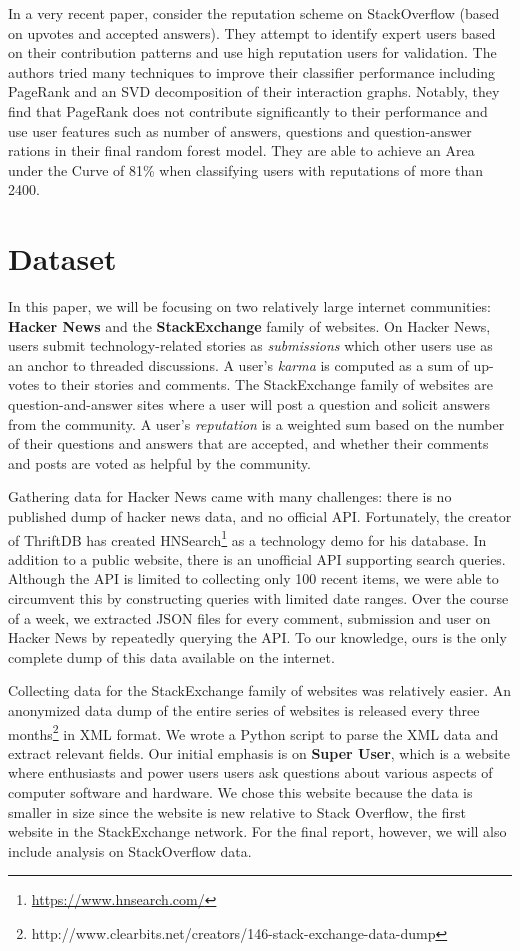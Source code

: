 \documentclass[11pt]{article}
\begin{document}
In a very recent paper, \citet{movshovitzanalysis} consider the reputation
scheme on StackOverflow (based on upvotes and accepted answers). They 
attempt to identify expert users based on their contribution
patterns and use high reputation users for validation. The authors tried many 
techniques to improve their classifier performance including PageRank and
an SVD decomposition of their interaction graphs. Notably, they find
that PageRank does not contribute significantly to their performance
and use user features such as number of answers, questions and question-answer 
rations in their final random forest model. They are
able to achieve an Area under the Curve of 81\% when classifying users
with reputations of more than 2400.

\section{Dataset}
In this paper, we will be focusing on two relatively large internet communities:
\textbf{Hacker News} and the \textbf{StackExchange} family of
websites. On Hacker News, users submit technology-related stories as
\textit{submissions} which other users use as an anchor to threaded discussions.
A user's \textit{karma} is computed as a sum of up-votes to their stories and
comments.  The StackExchange family of websites are question-and-answer sites
where a user will post a question and solicit answers from the community. A
user's \textit{reputation} is a weighted sum based on the number of their
questions and answers that are accepted, and whether their comments and posts
are voted as helpful by the community.

Gathering data for Hacker News came with many challenges: there is no published
dump of hacker news data, and no official API. Fortunately, the creator
of ThriftDB has created HNSearch\footnote{\url{https://www.hnsearch.com/}} as a technology
demo for his database. In addition to a public website, there is an unofficial API
supporting search queries. Although the API is limited to collecting 
only 100 recent items, we were able to circumvent this by constructing queries with limited
date ranges. Over the course of a week, we extracted JSON files for every comment,
submission and user on Hacker News by repeatedly querying the API\@. To our knowledge,
ours is the only complete dump of this data available on the internet.

Collecting data for the StackExchange family of websites was relatively easier.
An anonymized data dump of the entire series of websites is released every three
months\footnote{http://www.clearbits.net/creators/146-stack-exchange-data-dump}
in XML format. We wrote a Python script to parse the XML data and extract
relevant fields. Our initial emphasis is on \textbf{Super User}, which is a website where
enthusiasts and power users users ask questions about various aspects of
computer software and hardware. We chose this website because the data
is smaller in size since the website is new relative to Stack Overflow, the first
website in the StackExchange network. For the final report, however, we will
also include analysis on StackOverflow data.
\end{document}
